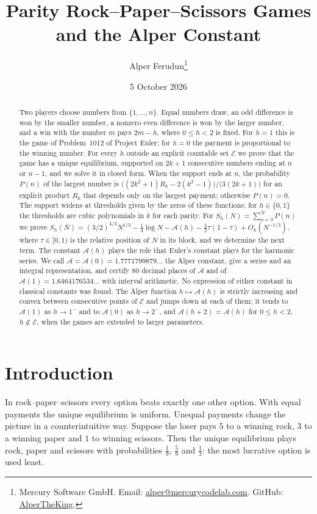 \documentclass[11pt]{article}
\title{Parity Rock--Paper--Scissors Games\\and the Alper Constant}
\author{Alper Ferudun\thanks{Mercury Software GmbH.
Email: \href{mailto:alper@mercurycodelab.com}{alper@mercurycodelab.com}.
GitHub: \href{https://github.com/AlperTheKing}{AlperTheKing}.}}
\date{5 October 2026}
\theoremstyle{definition}
\theoremstyle{remark}
\newcommand{\Alp}{\mathcal{A}}
\begin{document}
\maketitle

\begin{abstract}
Two players choose numbers from $\{1,\dots,n\}$. Equal numbers draw, an
odd difference is won by the smaller number, a nonzero even difference is
won by the larger number, and a win with the number $m$ pays $2m-h$, where
$0\le h<2$ is fixed. For $h=1$ this is the game of Problem~1012 of
Project Euler; for $h=0$ the payment is proportional to the winning
number. For every $h$ outside an explicit countable set $\mathcal E$ we
prove that the game has a unique equilibrium, supported on $2k+1$ consecutive numbers
ending at $n$ or $n-1$, and we solve it in closed form. When the support
ends at $n$, the probability $P(n)$ of the largest number is
$\bigl((2k^2+1)R_k-2(k^2-1)\bigr)/\bigl(3(2k+1)\bigr)$ for an explicit
product $R_k$ that depends only on the largest payment; otherwise $P(n)=0$.
The support
widens at thresholds given by the zeros of these functions; for
$h\in\{0,1\}$ the thresholds are cubic polynomials in $k$ for each parity. For
$S_h(N)=\sum_{n=3}^{N}P(n)$ we prove
$S_h(N)=(3/2)^{4/3}N^{1/3}-\tfrac14\log N-\Alp(h)-\tfrac32\tau(1-\tau)
+O_h(N^{-1/3})$, where $\tau\in[0,1)$ is the relative position of $N$ in its
block, and we determine the next term. The constant $\Alp(h)$ plays the
role that Euler's constant plays for the harmonic series. We call
$\Alp=\Alp(0)=1.7771799879\ldots$ the Alper constant, give a series and
an integral representation, and certify $80$ decimal places of $\Alp$ and
of $\Alp(1)=1.6464176534\ldots$ with interval arithmetic. No expression
of either constant in classical constants was found. The Alper function
$h\mapsto\Alp(h)$ is strictly increasing and convex between consecutive
points of $\mathcal E$ and jumps down at each of them; it tends to
$\Alp(1)$ as $h\to1^-$ and to $\Alp(0)$ as $h\to2^-$, and
$\Alp(h+2)=\Alp(h)$ for $0\le h<2$, $h\notin\mathcal E$, when the
games are extended to larger parameters.
\end{abstract}

\section{Introduction}

In rock--paper--scissors every option beats exactly one other option.
With equal payments the unique equilibrium is uniform. Unequal payments
change the picture in a counterintuitive way. Suppose the loser pays $5$
to a winning rock, $3$ to a winning paper and $1$ to winning scissors.
Then the unique equilibrium plays rock, paper and scissors with
probabilities $\frac19$, $\frac59$ and $\frac13$: the most lucrative
option is used least.
\end{document}
